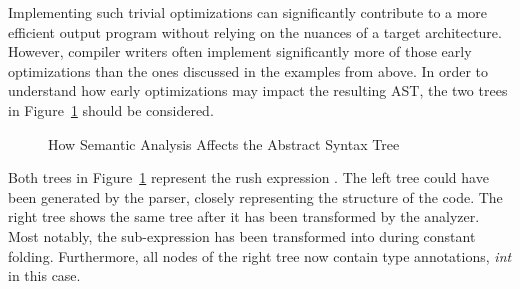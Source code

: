 Implementing such trivial optimizations can significantly contribute to a more efficient output program without relying on the nuances of a target architecture.
However, compiler writers often implement significantly more of those early optimizations than the ones discussed in the examples from above.
In order to understand how early optimizations may impact the resulting AST,
the two trees in Figure~\ref{fig:analysis_tree_conv} should be considered.

\noindent
\begin{figure}[h]
        \centering
	\caption{How Semantic Analysis Affects the Abstract Syntax Tree}\label{fig:analysis_tree_conv}
\end{figure}

Both trees in Figure~\ref{fig:analysis_tree_conv} represent the rush expression .
The left tree could have been generated by the parser, closely representing the structure of the code.
The right tree shows the same tree after it has been transformed by the analyzer.
Most notably, the sub-expression  has been transformed into  during constant folding.
Furthermore, all nodes of the right tree now contain type annotations, \emph{int} in this case.
